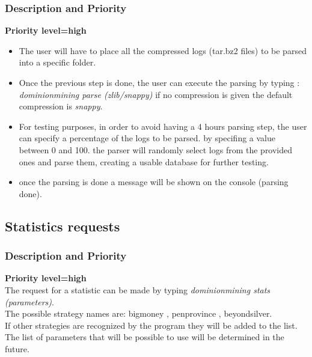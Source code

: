 \documentclass{scrreprt}
\begin{document}
\subsubsection{Description and Priority}
\textbf{Priority level=high}\\
\begin{itemize}
  \item The user will have to place all the compressed logs (tar.bz2 files) to be parsed into a
    specific folder.
  \item Once the previous step is done, the user can execute the parsing by
      typing : \textit{dominionmining parse (zlib/snappy)} if no compression is
      given the default compression is \textit{snappy}.
    \item For testing purposes, in order to avoid having a 4 hours parsing step, the user can specify a percentage of the logs to be parsed. by specifing a value between 0 and 100. the parser will randomly select logs from the provided ones and parse them, creating a usable database for further testing.
    \item once the parsing is done a message will be shown on the
      console (parsing done).
\end{itemize}

\subsection{Statistics requests}
\subsubsection{Description and Priority}
\textbf{Priority level=high}\\
The request for a statistic can be made by typing \textit{dominionmining stats (parameters)}.  \\
The possible strategy names are:
bigmoney , penprovince , beyondsilver.\\
If other strategies are recognized by the program they will be added to the list.\\
The list of parameters that will be possible to use will be determined in the
future.\\
\end{document}
